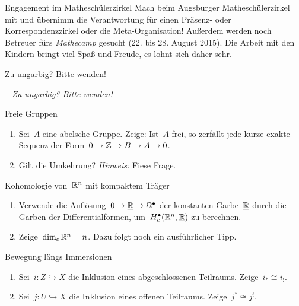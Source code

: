 \documentclass{uebblatt}
\begin{document}
\begin{aufgabe}{Engagement im Matheschülerzirkel}
Mach beim Augsburger Matheschülerzirkel mit und übernimm die Verantwortung für
einen Präsenz- oder Korrespondenzzirkel oder die Meta-Organisation!
Außerdem werden noch Betreuer fürs \emph{Mathecamp} gesucht (22. bis 28. August
2015). Die Arbeit mit den Kindern bringt viel Spaß und Freude, es lohnt sich daher sehr.
\end{aufgabe}

\ifxetex
  \begin{center}Zu ungarbig? Bitte wenden!
  \end{center}
\else
  \begin{center}\emph{-- Zu ungarbig? Bitte wenden! --}
  \end{center}
\fi

\newpage

\begin{aufgabe}{Freie Gruppen}
\begin{enumerate}
\item Sei~$A$ eine abelsche Gruppe. Zeige: Ist~$A$ frei, so zerfällt jede kurze
exakte Sequenz der Form~$0 \to \mathbb{Z} \to B \to A \to 0$.
\item Gilt die Umkehrung? {\tiny\emph{Hinweis:} Fiese Frage.}
\end{enumerate}
\end{aufgabe}

\begin{aufgabe}{Kohomologie von~$\mathbb{R}^n$ mit kompaktem Träger}
\begin{enumerate}
\item Verwende die Auflösung~$0 \to \underline{\mathbb{R}} \to \Omega^\bullet$ der konstanten
Garbe~$\underline{\mathbb{R}}$ durch die Garben der Differentialformen,
um~$H_c^\bullet(\mathbb{R}^n,\underline{\mathbb{R}})$ zu berechnen.
\item Zeige~$\dim_c \mathbb{R}^n = n$. {\tiny Dazu folgt noch ein ausführlicher Tipp.}
\end{enumerate}
\end{aufgabe}

\begin{aufgabe}{Bewegung längs Immersionen}
\begin{enumerate}
\item Sei~$i : Z \hookrightarrow X$ die Inklusion eines abgeschlossenen
Teilraums. Zeige~$i_* \cong i_!$.
\item Sei~$j : U \hookrightarrow X$ die Inklusion eines offenen Teilraums.
Zeige~$j^* \cong j^!$.
\end{enumerate}
\end{aufgabe}
\end{document}
